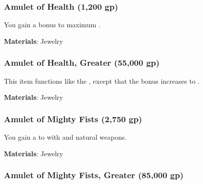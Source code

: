 
\lowercase{\hypertarget{item:Amulet of Health}{}}\label{item:Amulet of Health}
\hypertarget{item:Amulet of Health}{\subsubsection{Amulet of Health\hfill{} (1,200 gp)}}

You gain a  bonus to maximum .



\vspace{0.25em}
\textbf{Materials}: Jewelry


\lowercase{\hypertarget{item:Amulet of Health, Greater}{}}\label{item:Amulet of Health, Greater}
\hypertarget{item:Amulet of Health, Greater}{\subsubsection{Amulet of Health, Greater\hfill{} (55,000 gp)}}

This item functions like the , except that the bonus increases to .



\vspace{0.25em}
\textbf{Materials}: Jewelry


\lowercase{\hypertarget{item:Amulet of Mighty Fists}{}}\label{item:Amulet of Mighty Fists}
\hypertarget{item:Amulet of Mighty Fists}{\subsubsection{Amulet of Mighty Fists\hfill{} (2,750 gp)}}

You gain a   to  with  and natural weapons.



\vspace{0.25em}
\textbf{Materials}: Jewelry


\lowercase{\hypertarget{item:Amulet of Mighty Fists, Greater}{}}\label{item:Amulet of Mighty Fists, Greater}
\hypertarget{item:Amulet of Mighty Fists, Greater}{\subsubsection{Amulet of Mighty Fists, Greater\hfill{} (85,000 gp)}}

